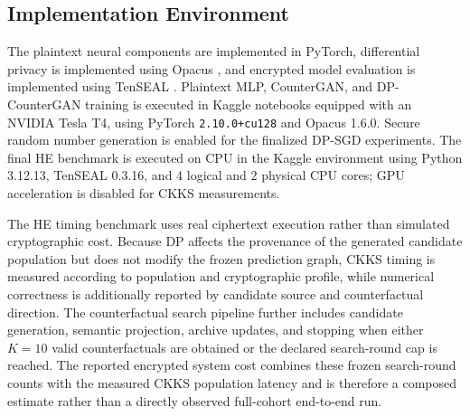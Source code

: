 \documentclass[preprint,12pt]{elsarticle}
\begin{document}

\subsection{Implementation Environment}
\label{subsec:implementation_details}

  The plaintext neural components are implemented in PyTorch, differential
  privacy is implemented using Opacus \cite{yousefpour2021opacus}, and encrypted
  model evaluation is implemented using TenSEAL \cite{benaissa2021tenseal}.
  Plaintext MLP, CounterGAN, and DP-CounterGAN training is executed in Kaggle
  notebooks equipped with an NVIDIA Tesla T4, using PyTorch
  \texttt{2.10.0+cu128} and Opacus 1.6.0. Secure random number generation is
  enabled for the finalized DP-SGD experiments. The final HE benchmark is
  executed on CPU in the Kaggle environment using Python 3.12.13, TenSEAL 0.3.16,
  and 4 logical and 2 physical CPU cores; GPU acceleration is disabled for CKKS
  measurements.

  The HE timing benchmark uses real ciphertext execution rather than simulated
  cryptographic cost. Because DP affects the provenance of the generated
  candidate population but does not modify the frozen prediction graph, CKKS
  timing is measured according to population and cryptographic profile, while
  numerical correctness is additionally reported by candidate source and
  counterfactual direction. The counterfactual search pipeline further includes
  candidate generation, semantic projection, archive updates, and stopping when
  either $K=10$ valid counterfactuals are obtained or the declared search-round
  cap is reached. The reported encrypted system cost combines these frozen
  search-round counts with the measured CKKS population latency and is therefore
  a composed estimate rather than a directly observed full-cohort end-to-end run.
\end{document}
